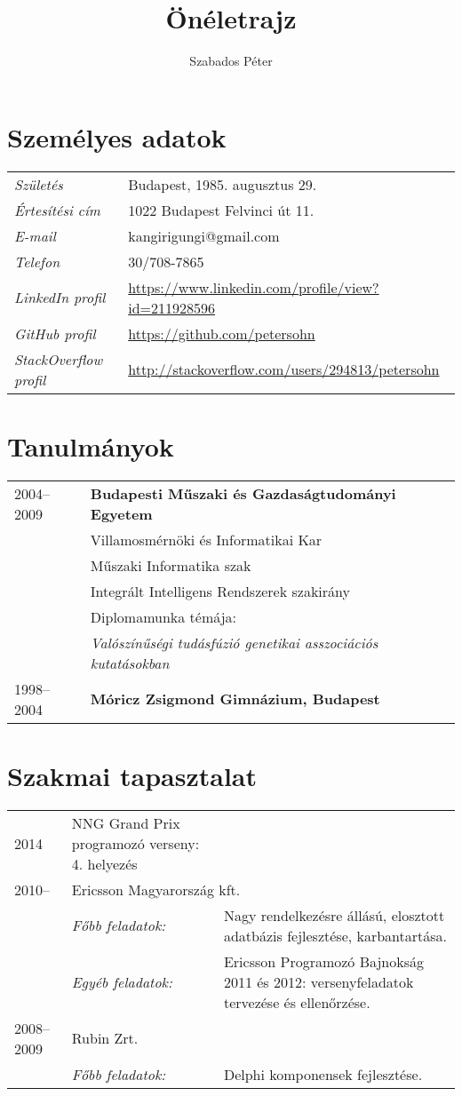 \documentclass[a4paper,10pt]{article}
\title{\textbf{Önéletrajz}}
\author{Szabados Péter}
\newcommand{\pont}[1]{\emph{#1}}
\begin{document}
\maketitle

\section*{Személyes adatok}
\begin{tabular}{ll}
 \pont{Születés}&Budapest, 1985. augusztus 29.\\
 \pont{Értesítési cím}&1022 Budapest Felvinci út 11.\\
 \pont{E-mail}&kangirigungi@gmail.com\\
 \pont{Telefon}&30/708-7865\\
 \pont{LinkedIn profil}&\href{https://www.linkedin.com/profile/view?id=211928596}{https://www.linkedin.com/profile/view?id=211928596}\\
 \pont{GitHub profil}&\href{https://github.com/petersohn}{https://github.com/petersohn}\\
 \pont{StackOverflow profil}&\href{http://stackoverflow.com/users/294813/petersohn}{http://stackoverflow.com/users/294813/petersohn}\\
\end{tabular}

\section*{Tanulmányok}
\begin{tabular}{ll}
 2004--2009
  &\textbf{Budapesti Műszaki és Gazdaságtudományi Egyetem}\\
  &Villamosmérnöki és Informatikai Kar\\
  &Műszaki Informatika szak\\
  &Integrált Intelligens Rendszerek szakirány\\
  &Diplomamunka témája:\\
  &\emph{Valószínűségi tudásfúzió genetikai asszociációs kutatásokban}\\
  1998--2004&\textbf{Móricz Zsigmond Gimnázium, Budapest}
\end{tabular}

\section*{Szakmai tapasztalat}
\begin{tabular}{llp{10cm}}
 2014&NNG Grand Prix programozó verseny: 4. helyezés\\
 2010--&\multicolumn{2}{l}{Ericsson Magyarország kft.}\\
  &\emph{Főbb feladatok:}&Nagy rendelkezésre állású, elosztott adatbázis fejlesztése, karbantartása.\\
  &\emph{Egyéb feladatok:}&Ericsson Programozó Bajnokság 2011 és 2012: versenyfeladatok tervezése és ellenőrzése.\\
 2008--2009&\multicolumn{2}{l}{Rubin Zrt.}\\
  &\emph{Főbb feladatok:}&Delphi komponensek fejlesztése.
\end{tabular}
\end{document}
